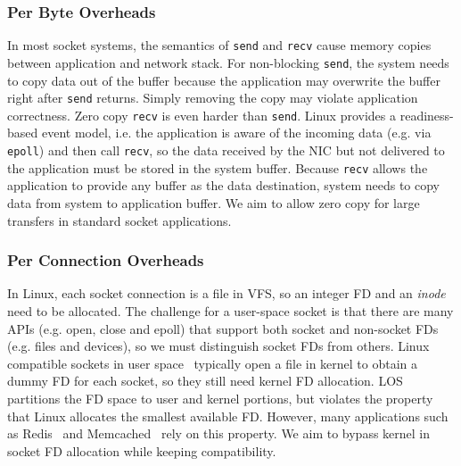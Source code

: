 \subsubsection{Per Byte Overheads}
\label{subsec:per-byte-overhead}
\quad

In most socket systems, the semantics of \texttt{send} and \texttt{recv} cause memory copies between application and network stack. For non-blocking \texttt{send}, the system needs to copy data out of the buffer because the application may overwrite the buffer right after \texttt{send} returns. Simply removing the copy may violate application correctness.
Zero copy \texttt{recv} is even harder than \texttt{send}.
Linux provides a readiness-based event model, i.e. the application is aware of the incoming data (e.g. via \texttt{epoll}) and then call \texttt{recv}, so the data received by the NIC but not delivered to the application must be stored in the system buffer.
Because \texttt{recv} allows the application to provide any buffer as the data destination, system needs to copy data from system to application buffer. 
We aim to allow zero copy for large transfers in standard socket applications.



\subsubsection{Per Connection Overheads}
\label{subsec:per-connection-overhead}
\quad

In Linux, each socket connection is a file in VFS, so an integer FD and an \emph{inode} need to be allocated.
The challenge for a user-space socket is that there are many APIs (e.g. open, close and epoll) that support both socket and non-socket FDs (e.g. files and devices), so we must distinguish socket FDs from others.
Linux compatible sockets in user space~\cite{libvma,rsockets} typically open a file in kernel to obtain a dummy FD for each socket, so they still need kernel FD allocation.
LOS~\cite{huang2017high} partitions the FD space to user and kernel portions, but violates the property that Linux allocates the smallest available FD.
However, many applications such as Redis~\cite{redis} and Memcached~\cite{memcached} rely on this property.
We aim to bypass kernel in socket FD allocation while keeping compatibility.

